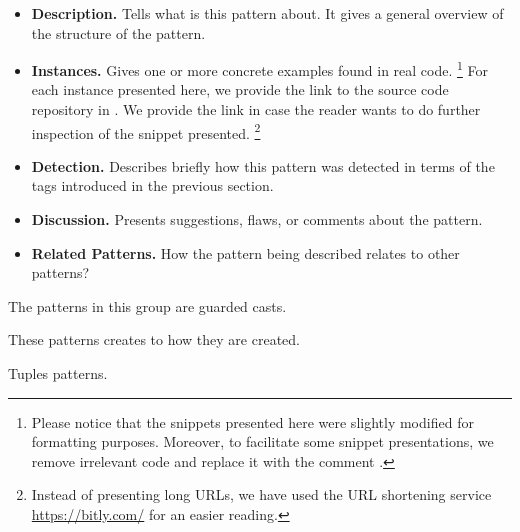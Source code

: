 \begin{itemize}
\item \textbf{Description.}
Tells what is this pattern about.
It gives a general overview of the structure of the pattern.
\item \textbf{Instances.}
Gives one or more concrete examples found in real code.%
\footnote{Please notice that the snippets presented here were slightly
modified for formatting purposes.
Moreover, to facilitate some snippet presentations,
we remove irrelevant code and replace it with the
comment \code{// [...]}.}
For each instance presented here, we provide the link to the source code repository in \lgtm{}.
We provide the link in case the reader wants to do further inspection
of the snippet presented.%
\footnote{Instead of presenting \lgtm{} long URLs,
we have used the URL shortening service \url{https://bitly.com/}
for an easier reading.}
\item \textbf{Detection.}
Describes briefly how this pattern was detected in terms of the tags introduced in the previous section.
\item \textbf{Discussion.}
Presents suggestions, flaws, or comments about the pattern.
\item \textbf{Related Patterns.}
How the pattern being described relates to other patterns?
\end{itemize}


The patterns in this group are guarded casts.








These patterns creates to how they are created.







% 



Tuples patterns.






